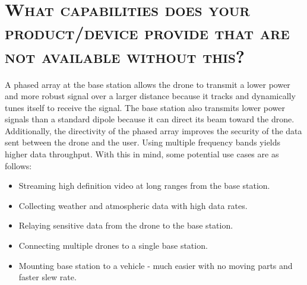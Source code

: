 \documentclass[11pt]{article}
\numberwithin{figure}{section}
\begin{document}
\section{\textsc{What capabilities does your product/device provide that are not available without this?}}
A phased array at the base station allows the drone to transmit a lower power and more robust signal over a larger distance because it tracks and dynamically tunes itself to receive the signal.  The base station also transmits lower power signals than a standard dipole because it can direct its beam toward the drone.  Additionally, the directivity of the phased array improves the security of the data sent between the drone and the user.  Using multiple frequency bands yields higher data throughput.  With this in mind, some potential use cases are as follows:
	\begin{itemize}
		\item Streaming high definition video at long ranges from the base station.
		\item Collecting weather and atmospheric data with high data rates.
		\item Relaying sensitive data from the drone to the base station.
		\item Connecting multiple drones to a single base station.
		\item Mounting base station to a vehicle - much easier with no moving parts and faster slew rate.
	\end{itemize}
\end{document}
